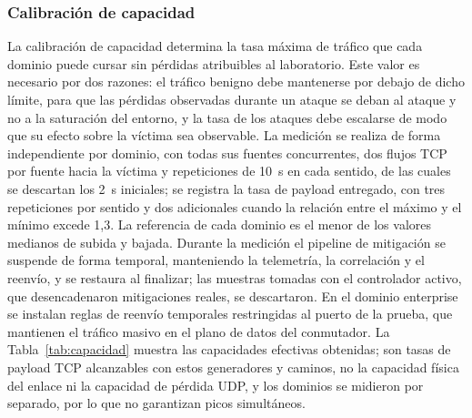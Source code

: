 \subsubsection{Calibración de capacidad}

La calibración de capacidad determina la tasa máxima de tráfico que cada dominio puede cursar sin pérdidas atribuibles al laboratorio. Este valor es necesario por dos razones: el tráfico benigno debe mantenerse por debajo de dicho límite, para que las pérdidas observadas durante un ataque se deban al ataque y no a la saturación del entorno, y la tasa de los ataques debe escalarse de modo que su efecto sobre la víctima sea observable. La medición se realiza de forma independiente por dominio, con todas sus fuentes concurrentes, dos flujos TCP por fuente hacia la víctima y repeticiones de 10~s en cada sentido, de las cuales se descartan los 2~s iniciales; se registra la tasa de payload entregado, con tres repeticiones por sentido y dos adicionales cuando la relación entre el máximo y el mínimo excede 1,3. La referencia de cada dominio es el menor de los valores medianos de subida y bajada. Durante la medición el pipeline de mitigación se suspende de forma temporal, manteniendo la telemetría, la correlación y el reenvío, y se restaura al finalizar; las muestras tomadas con el controlador activo, que desencadenaron mitigaciones reales, se descartaron. En el dominio enterprise se instalan reglas de reenvío temporales restringidas al puerto de la prueba, que mantienen el tráfico masivo en el plano de datos del conmutador. La Tabla~\ref{tab:capacidad} muestra las capacidades efectivas obtenidas; son tasas de payload TCP alcanzables con estos generadores y caminos, no la capacidad física del enlace ni la capacidad de pérdida UDP, y los dominios se midieron por separado, por lo que no garantizan picos simultáneos.

